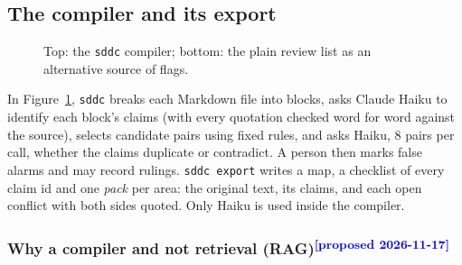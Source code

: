 \documentclass{article}
\newcommand{\proposed}{\textcolor{blue}{\textsuperscript{[proposed 2026-11-17]}}}
\newcommand{\code}[1]{\texttt{#1}}
\begin{document}
\subsection{The compiler and its export}\label{sec:compiler}

\begin{figure}[t]
\centering
{}
\caption{Top: the \code{sddc} compiler; bottom: the plain review list as an alternative source of flags.}
\label{fig:pipeline}
\end{figure}

In Figure~\ref{fig:pipeline}, \code{sddc} breaks each Markdown file into blocks, asks Claude Haiku to identify each block's claims (with every quotation checked word for word against the source), selects candidate pairs using fixed rules, and asks Haiku, 8 pairs per call, whether the claims duplicate or contradict. A person then
marks false alarms and may record rulings. \code{sddc export} writes a map, a checklist of every claim id and
one \emph{pack} per area: the original text, its claims, and each open conflict with both sides quoted.
Only Haiku is used inside the compiler.

\subsubsection{Why a compiler and not retrieval (RAG)\proposed}\label{sec:rag}
\end{document}
